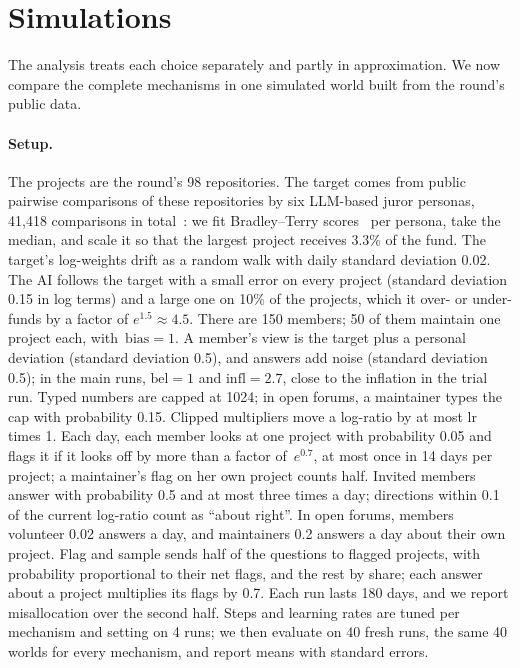 \documentclass[doubleblind]{ecai}
\theoremstyle{remark}
\newcommand{\lr}{\mathrm{lr}}
\newcommand{\bel}{\mathrm{bel}}
\newcommand{\infl}{\mathrm{infl}}
\newcommand{\bias}{\mathrm{bias}}
\begin{document}
\section{Simulations}\label{sec:sim}

The analysis treats each choice separately and partly in approximation. We now compare the complete mechanisms in one simulated world built from the round's public data.

\paragraph{Setup.}
The projects are the round's 98 repositories. The target comes from public pairwise comparisons of these repositories by six LLM-based juror personas, 41{,}418 comparisons in total~\cite{gasquez2025weights}: we fit Bradley--Terry scores~\cite{bradley1952rank} per persona, take the median, and scale it so that the largest project receives 3.3\% of the fund. The target's log-weights drift as a random walk with daily standard deviation 0.02. The AI follows the target with a small error on every project (standard deviation 0.15 in log terms) and a large one on 10\% of the projects, which it over- or under-funds by a factor of $e^{1.5}\approx 4.5$. There are 150 members; 50 of them maintain one project each, with~$\bias = 1$. A member's view is the target plus a personal deviation (standard deviation 0.5), and answers add noise (standard deviation 0.5); in the main runs, $\bel = 1$ and $\infl = 2.7$, close to the inflation in the trial run. Typed numbers are capped at 1024; in open forums, a maintainer types the cap with probability 0.15. Clipped multipliers move a log-ratio by at most $\lr$ times 1. Each day, each member looks at one project with probability 0.05 and flags it if it looks off by more than a factor of~$e^{0.7}$, at most once in 14 days per project; a maintainer's flag on her own project counts half. Invited members answer with probability 0.5 and at most three times a day; directions within 0.1 of the current log-ratio count as ``about right''. In open forums, members volunteer 0.02 answers a day, and maintainers 0.2 answers a day about their own project. Flag and sample sends half of the questions to flagged projects, with probability proportional to their net flags, and the rest by share; each answer about a project multiplies its flags by 0.7. Each run lasts 180 days, and we report misallocation over the second half. Steps and learning rates are tuned per mechanism and setting on 4 runs; we then evaluate on 40 fresh runs, the same 40 worlds for every mechanism, and report means with standard errors.
\end{document}
